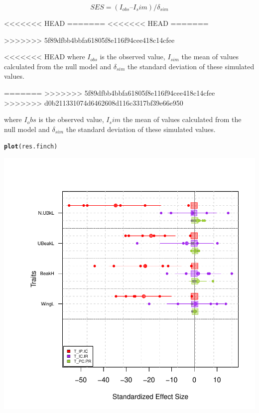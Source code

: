 \documentclass[12pt]{article}\usepackage[]{graphicx}\usepackage[]{color}
\makeatletter
\def\maxwidth{ %
  \ifdim\Gin@nat@width>\linewidth
    \linewidth
  \else
    \Gin@nat@width
  \fi
}
\newcommand{\hlstd}[1]{\textcolor[rgb]{0.345,0.345,0.345}{#1}}%
\newcommand{\hlkwd}[1]{\textcolor[rgb]{0.737,0.353,0.396}{\textbf{#1}}}%
\newenvironment{kframe}{%
 \def\at@end@of@kframe{}%
 \ifinner\ifhmode%
  \def\at@end@of@kframe{\end{minipage}}%
  \begin{minipage}{\columnwidth}%
 \fi\fi%
 \def\FrameCommand##1{\hskip\@totalleftmargin \hskip-\fboxsep
 \colorbox{shadecolor}{##1}\hskip-\fboxsep
     \hskip-\linewidth \hskip-\@totalleftmargin \hskip\columnwidth}%
 \MakeFramed {\advance\hsize-\width
   \@totalleftmargin\z@ \linewidth\hsize
   \@setminipage}}%
 {\par\unskip\endMakeFramed%
 \at@end@of@kframe}
\newenvironment{knitrout}{}{} %
\makeatother
\begin{document}
\begin{center}
$$ SES = (I_{obs} – I{_sim}) / \delta_{sim} $$
\end{center}
<<<<<<< HEAD
=======
<<<<<<< HEAD
=======

>>>>>>> 5f89dfbb4bbfa61805f8e116f94cee418c14cfee


<<<<<<< HEAD
where $I_{obs}$ is the observed value, $I_{sim}$ the mean of values calculated from the null model and $\delta_{sim}$ the standard deviation of these simulated values.

=======
>>>>>>> 5f89dfbb4bbfa61805f8e116f94cee418c14cfee
>>>>>>> d0b211331074d6462608d116c3317bf39e66e950

where $I_obs$ is the observed value, $I_sim$ the mean of values calculated from the null model and $\delta_{sim}$ the standard deviation of these simulated values.


\begin{knitrout}
\color{fgcolor}\begin{kframe}
\begin{alltt}
\hlkwd{plot}\hlstd{(res.finch)}
\end{alltt}
\end{kframe}

{\centering \includegraphics[width=\maxwidth]{figure/unnamed-chunk-34} 

}



\end{knitrout}
\end{document}
